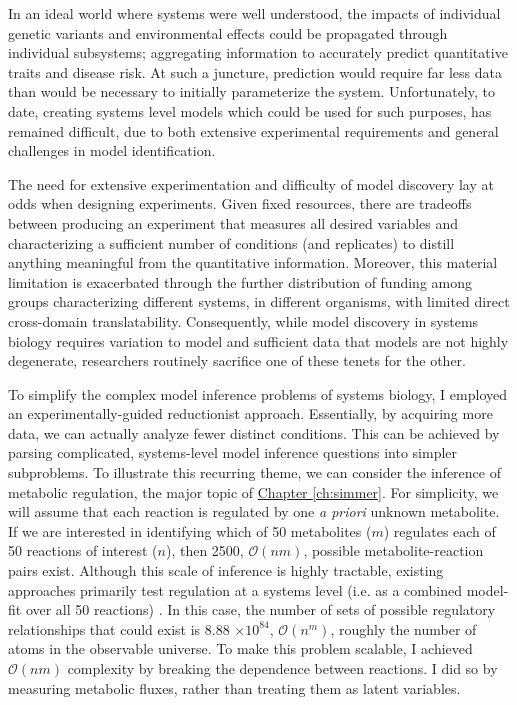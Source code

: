 In an ideal world where systems were well understood, the impacts of individual genetic variants and environmental effects could be propagated through individual subsystems; aggregating information to accurately predict quantitative traits and disease risk.  At such a juncture, prediction would require far less data than would be necessary to initially parameterize the system. Unfortunately, to date, creating systems level models which could be used for such purposes, has remained difficult, due to both extensive experimental requirements and general challenges in model identification.

The need for extensive experimentation and difficulty of model discovery lay at odds when designing experiments. Given fixed resources, there are tradeoffs between producing an experiment that measures all desired variables and characterizing a sufficient number of conditions (and replicates) to distill anything meaningful from the quantitative information. Moreover, this material limitation is exacerbated through the further distribution of funding among groups characterizing different systems, in different organisms, with limited direct cross-domain translatability. Consequently, while model discovery in systems biology requires variation to model and sufficient data that models are not highly degenerate, researchers routinely sacrifice one of these tenets for the other.

To simplify the complex model inference problems of systems biology, I employed an experimentally-guided reductionist approach. Essentially, by acquiring more data, we can actually analyze fewer distinct conditions. This can be achieved by parsing complicated, systems-level model inference questions into simpler subproblems. To illustrate this recurring theme, we can consider the inference of metabolic regulation, the major topic of \hyperref[ch:simmer]{Chapter \ref{ch:simmer}}. For simplicity, we will assume that each reaction is regulated by one \textit{a priori} unknown metabolite. If we are interested in identifying which of 50 metabolites ($m$) regulates each of 50 reactions of interest ($n$), then 2500, $\mathcal{O}(nm)$, possible metabolite-reaction pairs exist.  Although this scale of inference is highly tractable, existing approaches primarily test regulation at a systems level (i.e. as a combined model-fit over all 50 reactions) \cite{Link:2013dj, Zampar:2013fr}.  In this case, the number of sets of possible regulatory relationships that could exist is 8.88 $\times 10^{84}$, $\mathcal{O}(n^{m})$, roughly the number of atoms in the observable universe. To make this problem scalable, I achieved $\mathcal{O}(nm)$ complexity by breaking the dependence between reactions. I did so by measuring metabolic fluxes, rather than treating them as latent variables.


